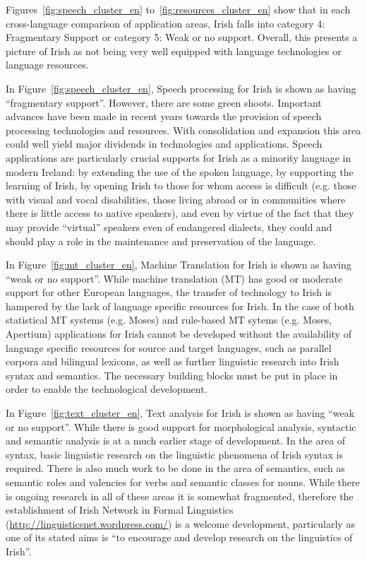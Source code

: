 \begin{multicols}{2}
Figures~\ref{fig:speech_cluster_en} to~\ref{fig:resources_cluster_en} show that in each cross-language comparison of application areas,  Irish falls into category 4: Fragmentary Support or category 5: Weak or no support. Overall, this presents a picture of Irish as not being very well equipped with language technologies or language resources. 

In Figure~\ref{fig:speech_cluster_en}, Speech processing for Irish is shown as having ``fragmentary support''. However, there are some green shoots. Important advances have been made in recent years towards the provision of speech processing technologies and resources. With consolidation and expansion this area could well yield major dividends in technologies and applications. Speech applications are particularly crucial supports for Irish as a minority language in modern Ireland: by extending the use of the spoken language, by supporting the learning of Irish, by opening Irish to those for whom access is difficult (e.g. those with visual and vocal disabilities, those living abroad or in communities where there is little access to native speakers), and even by virtue of the fact that they may provide ``virtual'' speakers even of endangered dialects, they could and should play a role in the maintenance and preservation of the language. 

In Figure~\ref{fig:mt_cluster_en}, Machine Translation for Irish is shown as having ``weak or no support''. While machine translation (MT) has good or moderate support for other European languages, the transfer of technology to Irish is hampered by the lack of language specific resources for Irish. In the case of both statistical MT systems (e.g. Moses) and rule-based MT sytems (e.g. Moses, Apertium) applications for Irish cannot be developed  without the availability of language specific resources for source and target languages, such as parallel corpora and bilingual lexicons,  as well as further linguistic research into Irish syntax and semantics. The necessary building blocks must be put in place in order to enable the technological development.

In Figure~\ref{fig:text_cluster_en}, Text analysis for Irish is shown as having ``weak or no support''. While there is good support for morphological analysis, syntactic and semantic analysis is at a much earlier stage of development. In the area of syntax, basic linguistic research on the linguistic phenomena of Irish syntax is required. There is also much work to be done in the area of semantics, such as semantic roles and valencies for verbs and semantic classes for nouns. While there is ongoing research in all of these areas it is somewhat fragmented, therefore the establishment of  Irish Network in Formal Linguistics (\url{http://linguisticsnet.wordpress.com/}) is a welcome development, particularly as one of its stated aims is ``to encourage and develop research on the linguistics of Irish''.


\end{multicols}
